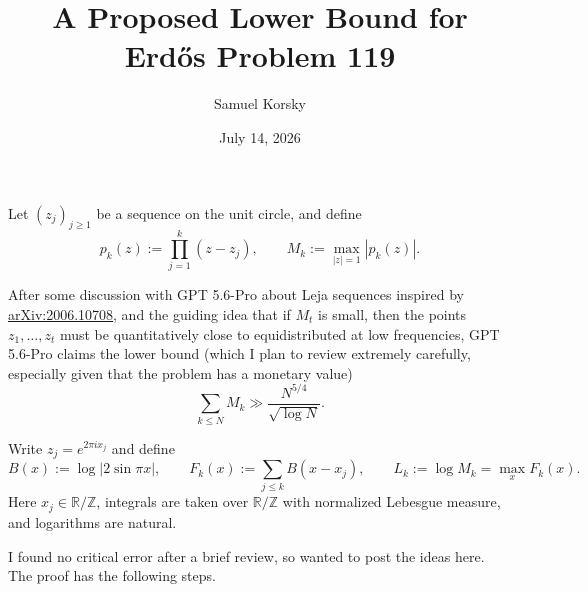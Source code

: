 \documentclass[11pt]{article}
\title{A Proposed Lower Bound for Erd\H{o}s Problem 119}
\author{Samuel Korsky}
\date{July 14, 2026}
\begin{document}
\onehalfspacing
\maketitle
\singlespacing
\setlength{\parskip}{7pt}
\vspace{-7pt}

Let $(z_j)_{j\geq 1}$ be a sequence on the unit circle, and define
\[
  p_k(z) := \prod_{j=1}^k (z-z_j),
  \qquad
  M_k := \max_{|z|=1} |p_k(z)|.
\]

After some discussion with GPT 5.6-Pro about Leja sequences inspired by
\href{https://arxiv.org/abs/2006.10708}{arXiv:2006.10708}, and the guiding
idea that if $M_t$ is small, then the points $z_1,\ldots,z_t$ must be
quantitatively close to equidistributed at low frequencies, GPT 5.6-Pro
claims the lower bound (which I plan to review extremely carefully,
especially given that the problem has a monetary value)
\[
  \sum_{k\leq N} M_k \gg \frac{N^{5/4}}{\sqrt{\log N}}.
\]

Write $z_j=e^{2\pi i x_j}$ and define
\[
  B(x) := \log |2\sin \pi x|,
  \qquad
  F_k(x) := \sum_{j\leq k} B(x-x_j),
  \qquad
  L_k := \log M_k = \max_x F_k(x).
\]
Here $x_j\in\mathbb{R}/\mathbb{Z}$, integrals are taken over
$\mathbb{R}/\mathbb{Z}$ with normalized Lebesgue measure, and logarithms
are natural.

I found no critical error after a brief review, so wanted to post the ideas
here. The proof has the following steps.
\end{document}
